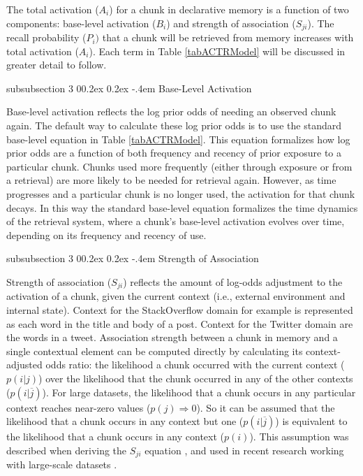 \documentclass[man,floatsintext,donotrepeattitle]{apa6}
\makeatletter
\renewcommand{\subsubsection}{%
  \@startsection
  {subsubsection}%
  {3}%
  {\parindent}%
  {0\baselineskip \@plus 0.2ex \@minus 0.2ex}%
  {-.4em}%
  {\normalfont\normalsize\bfseries\addperi}}
\makeatother
\begin{document}
The total activation ($A_{i}$) for a chunk in declarative memory is a function of two components: base-level activation ($B_{i}$) and strength of association ($S_{ji}$).
The recall probability ($P_{i})$ that a chunk will be retrieved from memory increases with total activation ($A_{i}$).
Each term in Table \ref{tabACTRModel} will be discussed in greater detail to follow.

\subsubsection{Base-Level Activation}

Base-level activation reflects the log prior odds of needing an observed chunk again.
The default way to calculate these log prior odds is to use the standard base-level equation in Table \ref{tabACTRModel}.
This equation formalizes how log prior odds are a function of both frequency and recency of prior exposure to a particular chunk.
Chunks used more frequently (either through exposure or from a retrieval) are more likely to be needed for retrieval again.
However, as time progresses and a particular chunk is no longer used, the activation for that chunk decays.
In this way the standard base-level equation formalizes the time dynamics of the retrieval system, where a chunk's base-level activation evolves over time, depending on its frequency and recency of use.

\subsubsection{Strength of Association}

Strength of association ($S_{ji}$) reflects the amount of log-odds adjustment to the activation of a chunk, given the current context (i.e., external environment and internal state).
Context for the StackOverflow domain for example is represented as each word in the title and body of a post.
Context for the Twitter domain are the words in a tweet.
Association strength between a chunk in memory and a single contextual element can be computed directly by calculating its context-adjusted odds ratio:
the likelihood a chunk occurred with the current context ($p(i|j)$) over the likelihood that the chunk occurred in any of the other contexts ($p(i|\overline{j})$).
For large datasets, the likelihood that a chunk occurs in any particular context reaches near-zero values ($p(j) \Rightarrow 0$).
So it can be assumed that the likelihood that a chunk occurs in any context but one ($p(i|\overline{j})$) is equivalent to the likelihood that a chunk occurs in any context ($p(i)$).
This assumption was described when deriving the $S_{ji}$ equation \parencite{Anderson1989}, and used in recent research working with large-scale datasets \parencites{Stanley2013,Farahat2004,Douglass2010}.
\end{document}
